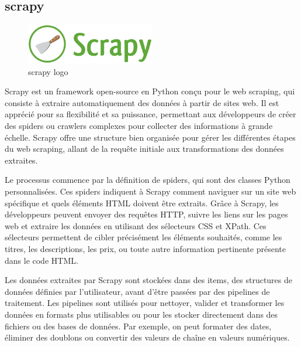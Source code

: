 \documentclass[a4paper,12pt]{report}
\numberwithin{equation}{section}
\begin{document}
\subsection{scrapy}
\begin{figure}[H]
    \centering
    \includegraphics[width=0.5\textwidth]{tech/scrapy.png}
    \caption{scrapy logo}
    \label{fig:scrapy logo}
\end{figure}
\par
Scrapy est un framework open-source en Python conçu pour le web scraping, qui consiste à extraire automatiquement des données à partir de sites web. Il est apprécié pour sa flexibilité et sa puissance, permettant aux développeurs de créer des spiders ou crawlers complexes pour collecter des informations à grande échelle. Scrapy offre une structure bien organisée pour gérer les différentes étapes du web scraping, allant de la requête initiale aux transformations des données extraites.\\ \par
Le processus commence par la définition de spiders, qui sont des classes Python personnalisées. Ces spiders indiquent à Scrapy comment naviguer sur un site web spécifique et quels éléments HTML doivent être extraits. Grâce à Scrapy, les développeurs peuvent envoyer des requêtes HTTP, suivre les liens sur les pages web et extraire les données en utilisant des sélecteurs CSS et XPath. Ces sélecteurs permettent de cibler précisément les éléments souhaités, comme les titres, les descriptions, les prix, ou toute autre information pertinente présente dans le code HTML.\\ \par
Les données extraites par Scrapy sont stockées dans des items, des structures de données définies par l'utilisateur, avant d'être passées par des pipelines de traitement. Les pipelines sont utilisés pour nettoyer, valider et transformer les données en formats plus utilisables ou pour les stocker directement dans des fichiers ou des bases de données. Par exemple, on peut formater des dates, éliminer des doublons ou convertir des valeurs de chaîne en valeurs numériques.
\end{document}
